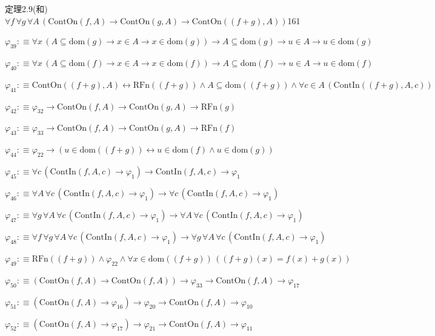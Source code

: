 \begin{fullproof}{定理2.9(和)}{$\forall f\,\forall g\,\forall A\,(\mathrm{ContOn}(f,A) \to \mathrm{ContOn}(g,A) \to \mathrm{ContOn}((f + g),A))$}{161}
\begin{abbrevlist}
\item $\varphi_{39} :\equiv \forall x\,(A \subseteq \mathrm{dom}(g) \to x \in A \to x \in \mathrm{dom}(g)) \to A \subseteq \mathrm{dom}(g) \to u \in A \to u \in \mathrm{dom}(g)$
\item $\varphi_{40} :\equiv \forall x\,(A \subseteq \mathrm{dom}(f) \to x \in A \to x \in \mathrm{dom}(f)) \to A \subseteq \mathrm{dom}(f) \to u \in A \to u \in \mathrm{dom}(f)$
\item $\varphi_{41} :\equiv \mathrm{ContOn}((f + g),A) \leftrightarrow \mathrm{RFn}((f + g)) \land A \subseteq \mathrm{dom}((f + g)) \land \forall c \in A\,(\mathrm{ContIn}((f + g),A,c))$
\item $\varphi_{42} :\equiv \varphi_{32} \to \mathrm{ContOn}(f,A) \to \mathrm{ContOn}(g,A) \to \mathrm{RFn}(g)$
\item $\varphi_{43} :\equiv \varphi_{33} \to \mathrm{ContOn}(f,A) \to \mathrm{ContOn}(g,A) \to \mathrm{RFn}(f)$
\item $\varphi_{44} :\equiv \varphi_{22} \to (u \in \mathrm{dom}((f + g)) \leftrightarrow u \in \mathrm{dom}(f) \land u \in \mathrm{dom}(g))$
\item $\varphi_{45} :\equiv \forall c\,(\mathrm{ContIn}(f,A,c) \to \varphi_{1}) \to \mathrm{ContIn}(f,A,c) \to \varphi_{1}$
\item $\varphi_{46} :\equiv \forall A\,\forall c\,(\mathrm{ContIn}(f,A,c) \to \varphi_{1}) \to \forall c\,(\mathrm{ContIn}(f,A,c) \to \varphi_{1})$
\item $\varphi_{47} :\equiv \forall g\,\forall A\,\forall c\,(\mathrm{ContIn}(f,A,c) \to \varphi_{1}) \to \forall A\,\forall c\,(\mathrm{ContIn}(f,A,c) \to \varphi_{1})$
\item $\varphi_{48} :\equiv \forall f\,\forall g\,\forall A\,\forall c\,(\mathrm{ContIn}(f,A,c) \to \varphi_{1}) \to \forall g\,\forall A\,\forall c\,(\mathrm{ContIn}(f,A,c) \to \varphi_{1})$
\item $\varphi_{49} :\equiv \mathrm{RFn}((f + g)) \land \varphi_{22} \land \forall x \in \mathrm{dom}((f + g))\,((f + g)(x) = f(x) + g(x))$
\item $\varphi_{50} :\equiv (\mathrm{ContOn}(f,A) \to \mathrm{ContOn}(f,A)) \to \varphi_{33} \to \mathrm{ContOn}(f,A) \to \varphi_{17}$
\item $\varphi_{51} :\equiv (\mathrm{ContOn}(f,A) \to \varphi_{16}) \to \varphi_{20} \to \mathrm{ContOn}(f,A) \to \varphi_{10}$
\item $\varphi_{52} :\equiv (\mathrm{ContOn}(f,A) \to \varphi_{17}) \to \varphi_{21} \to \mathrm{ContOn}(f,A) \to \varphi_{11}$

\end{abbrevlist}
\end{fullproof}
